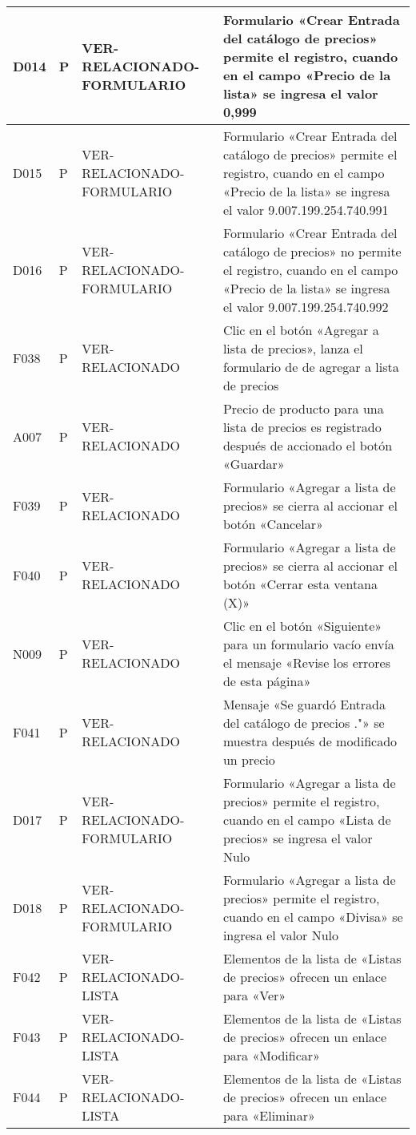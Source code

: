 \begin{landscape}
\begin{longtable}[htb]{|l|l|p{5.0cm}|p{13.0cm}|}
D014 & P & VER-RELACIONADO-FORMULARIO & Formulario «Crear Entrada del catálogo de precios» permite el registro, cuando en el campo «Precio de la lista» se ingresa el valor 0,999 \\ \hline
D015 & P & VER-RELACIONADO-FORMULARIO & Formulario «Crear Entrada del catálogo de precios» permite el registro, cuando en el campo «Precio de la lista» se ingresa el valor 9.007.199.254.740.991 \\ \hline
D016 & P & VER-RELACIONADO-FORMULARIO & Formulario «Crear Entrada del catálogo de precios» no permite el registro, cuando en el campo «Precio de la lista» se ingresa el valor 9.007.199.254.740.992 \\ \hline
F038 & P & VER-RELACIONADO & Clic en el botón «Agregar a lista de precios», lanza el formulario de de agregar a lista de precios \\ \hline
A007 & P & VER-RELACIONADO & Precio de producto para una lista de precios es registrado después de accionado el botón «Guardar» \\ \hline
F039 & P & VER-RELACIONADO & Formulario «Agregar a lista de precios» se cierra al accionar el botón «Cancelar» \\ \hline
F040 & P & VER-RELACIONADO & Formulario «Agregar a lista de precios» se cierra al accionar el botón «Cerrar esta ventana (X)» \\ \hline
N009 & P & VER-RELACIONADO & Clic en el botón «Siguiente» para un formulario vacío envía el mensaje «Revise los errores de esta página» \\ \hline
F041 & P & VER-RELACIONADO & Mensaje «Se guardó Entrada del catálogo de precios ."» se muestra después de modificado un precio \\ \hline
D017 & P & VER-RELACIONADO-FORMULARIO & Formulario «Agregar a lista de precios» permite el registro, cuando en el campo «Lista de precios» se ingresa el valor Nulo \\ \hline
D018 & P & VER-RELACIONADO-FORMULARIO & Formulario «Agregar a lista de precios» permite el registro, cuando en el campo «Divisa» se ingresa el valor Nulo \\ \hline
F042 & P & VER-RELACIONADO-LISTA & Elementos de la lista de «Listas de precios» ofrecen un enlace para «Ver» \\ \hline
F043 & P & VER-RELACIONADO-LISTA & Elementos de la lista de «Listas de precios» ofrecen un enlace para «Modificar» \\ \hline
F044 & P & VER-RELACIONADO-LISTA & Elementos de la lista de «Listas de precios» ofrecen un enlace para «Eliminar» \\ \hline

\end{longtable}
\end{landscape}
